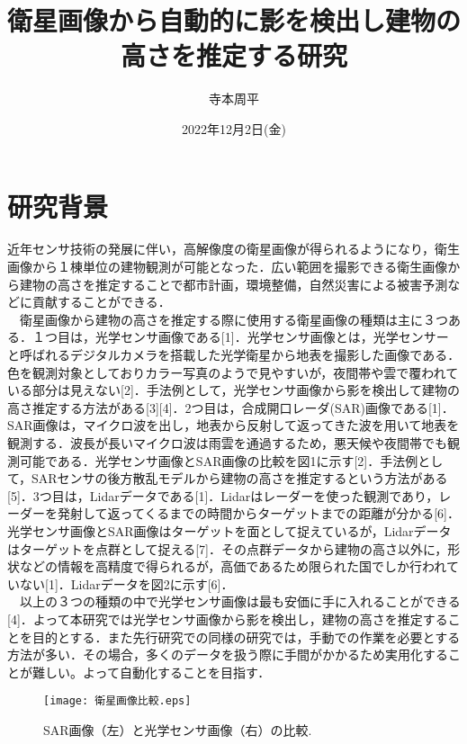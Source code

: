 \documentclass[a4j,twoside,twocolumn]{jarticle}
\author{寺本周平}
\date{2022年12月2日(金)}
\title{衛星画像から自動的に影を検出し建物の高さを推定する研究}
\begin{document}
\maketitle
\section{研究背景}
近年センサ技術の発展に伴い，高解像度の衛星画像が得られるようになり，衛生画像から１棟単位の建物観測が可能となった．広い範囲を撮影できる衛生画像から建物の高さを推定することで都市計画，環境整備，自然災害による被害予測などに貢献することができる．\\
　衛星画像から建物の高さを推定する際に使用する衛星画像の種類は主に３つある．１つ目は，光学センサ画像である[1]．光学センサ画像とは，光学センサーと呼ばれるデジタルカメラを搭載した光学衛星から地表を撮影した画像である．色を観測対象としておりカラー写真のようで見やすいが，夜間帯や雲で覆われている部分は見えない[2]．手法例として，光学センサ画像から影を検出して建物の高さ推定する方法がある[3][4]．2つ目は，合成開口レーダ(SAR)画像である[1]．SAR画像は，マイクロ波を出し，地表から反射して返ってきた波を用いて地表を観測する．波長が長いマイクロ波は雨雲を通過するため，悪天候や夜間帯でも観測可能である．光学センサ画像とSAR画像の比較を図1に示す[2]．手法例として，SARセンサの後方散乱モデルから建物の高さを推定するという方法がある[5]．3つ目は，Lidarデータである[1]．Lidarはレーダーを使った観測であり，レーダーを発射して返ってくるまでの時間からターゲットまでの距離が分かる[6]．光学センサ画像とSAR画像はターゲットを面として捉えているが，Lidarデータはターゲットを点群として捉える[7]．その点群データから建物の高さ以外に，形状などの情報を高精度で得られるが，高価であるため限られた国でしか行われていない[1]．Lidarデータを図2に示す[6]．\\
　以上の３つの種類の中で光学センサ画像は最も安価に手に入れることができる[4]．よって本研究では光学センサ画像から影を検出し，建物の高さを推定することを目的とする．また先行研究での同様の研究では，手動での作業を必要とする方法が多い．その場合，多くのデータを扱う際に手間がかかるため実用化することが難しい。よって自動化することを目指す．\\

\begin{figure}[t]
  \begin{center}
    \texttt{[image: 衛星画像比較.eps]}
    \caption{SAR画像（左）と光学センサ画像（右）の比較.}
    \label{fig1}
  \end{center}
\end{figure}
\end{document}

